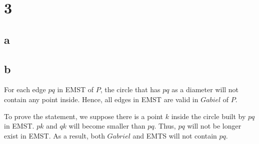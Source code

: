 \section*{3}
\subsection*{a}

\subsection*{b}
For each edge $pq$ in EMST of $P$, the circle that has $pq$ as a diameter will not contain any point inside.
Hence, all edges in EMST are valid in $Gabiel$ of $P$.

To prove the statement, we suppose there is a point $k$ inside the circle built by $pq$ in EMST.
$pk$ and $qk$ will become smaller than $pq$. Thus, $pq$ will not be longer exist in EMST.
As a result, both $Gabriel$ and EMTS will not contain $pq$.
